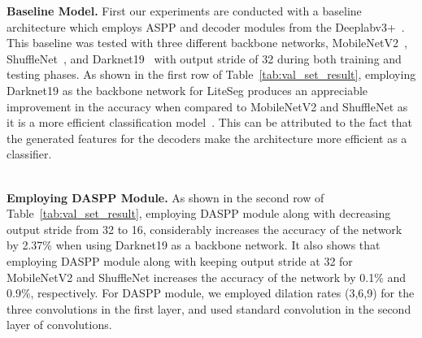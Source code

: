 \documentclass[conference,a4paper]{IEEEtran}
\begin{document}
\textbf{Baseline Model.} First our experiments are conducted with a baseline architecture which employs  ASPP and decoder modules from the Deeplabv3+~\cite{deeplabv3plus}. This baseline was tested with three different backbone networks, MobileNetV2~\cite{mobilenetv2}, ShuffleNet~\cite{shufflenet}, and Darknet19~\cite{yolo} with output stride of 32 during both training and testing phases. As shown in the first row of Table~\ref{tab:val_set_result}, employing Darknet19 as the backbone network for LiteSeg produces an appreciable improvement in the accuracy when compared to MobileNetV2 and ShuffleNet as it is a more efficient classification model~\cite{yolo}. This can be attributed to the fact that the generated features for the decoders make the architecture more efficient as a classifier. 


 
 
\textbf{\\Employing DASPP Module.} As shown in the second row of Table~\ref{tab:val_set_result}, employing DASPP module along with decreasing output stride from 32 to 16, considerably increases the accuracy of the network by 2.37\% when using Darknet19 as a backbone network. It also shows that employing DASPP module along with keeping output stride at 32 for MobileNetV2 and ShuffleNet increases the accuracy of the network by 0.1\% and 0.9\%, respectively. 
For DASPP module, we employed dilation rates (3,6,9) for the three  convolutions in the first layer, and used standard  convolution in the second layer of convolutions.
\end{document}
